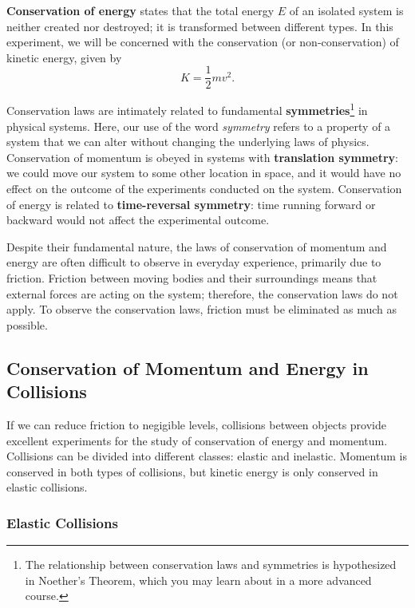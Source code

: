 \documentclass[addpoints]{physlabs}
\begin{document}
\begin{labsection}
\begin{theory}
    \textbf{Conservation of energy} states that the total energy $E$ of an isolated system is neither created nor destroyed; it is transformed between different types. In this experiment, we will be concerned with the conservation (or non-conservation) of kinetic energy, given by
    \begin{equation}\label{eq: kinetic energy}
        K = \frac{1}{2}mv^2.
    \end{equation}

    Conservation laws are intimately related to fundamental \textbf{symmetries}\footnote{The relationship between conservation laws and symmetries is hypothesized in Noether's Theorem, which you may learn about in a more advanced course.} in physical systems. Here, our use of the word \textsl{symmetry} refers to a property of a system that we can alter without changing the underlying laws of physics. Conservation of momentum is obeyed in systems with \textbf{translation symmetry}: we could move our system to some other location in space, and it would have no effect on the outcome of the experiments conducted on the system. Conservation of energy is related to \textbf{time-reversal symmetry}: time running forward or backward would not affect the experimental outcome.

    Despite their fundamental nature, the laws of conservation of momentum and energy are often difficult to observe in everyday experience, primarily due to friction. Friction between moving bodies and their surroundings means that external forces are acting on the system; therefore, the conservation laws do not apply. To observe the conservation laws, friction must be eliminated as much as possible.
    
    \subsection*{Conservation of Momentum and Energy in Collisions}

    If we can reduce friction to negigible levels, collisions between objects provide excellent experiments for the study of conservation of energy and momentum. Collisions can be divided into different classes: elastic and inelastic. Momentum is conserved in both types of collisions, but kinetic energy is only conserved in elastic collisions.

    \subsubsection*{Elastic Collisions}


\end{theory}
\end{labsection}
\end{document}
